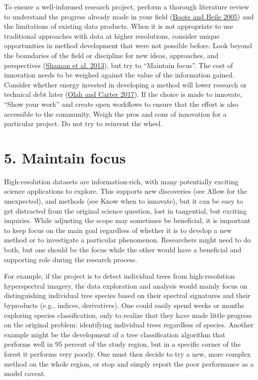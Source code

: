 \documentclass[
  12pt,
]{article}
\begin{document}
To ensure a well-informed research project, perform a thorough
literature review to understand the progress already made in your field
(\protect\hyperlink{ref-boote2005scholars}{Boote and Beile 2005}) and
the limitations of existing data products. When it is not appropriate to
use traditional approaches with data at higher resolutions, consider
unique opportunities in method development that were not possible
before. Look beyond the boundaries of the field or discipline for new
ideas, approaches, and perspectives
(\protect\hyperlink{ref-shaman2013fostering}{Shaman et al. 2013}), but
try to ``Maintain focus''. The cost of innovation needs to be weighed
against the value of the information gained. Consider whether energy
invested in developing a method will lower research or technical debt
later (\protect\hyperlink{ref-olah2017research}{Olah and Carter 2017}).
If the choice is made to innovate, ``Show your work'' and create open
workflows to ensure that the effort is also accessible to the community.
Weigh the pros and cons of innovation for a particular project. Do not
try to reinvent the wheel.

\hypertarget{maintain-focus}{%
\section{5. Maintain focus}\label{maintain-focus}}

High-resolution datasets are information-rich, with many potentially
exciting science applications to explore. This supports new discoveries
(see Allow for the unexpected), and methods (see Know when to innovate),
but it can be easy to get distracted from the original science question,
lost in tangential, but exciting inquiries. While adjusting the scope
may sometimes be beneficial, it is important to keep focus on the main
goal regardless of whether it is to develop a new method or to
investigate a particular phenomenon. Researchers might need to do both,
but one should be the focus while the other would have a beneficial and
supporting role during the research process.

For example, if the project is to detect individual trees from
high-resolution hyperspectral imagery, the data exploration and analysis
would mainly focus on distinguishing individual tree species based on
their spectral signatures and their byproducts (e.g., indices,
derivatives). One could easily spend weeks or months exploring species
classification, only to realize that they have made little progress on
the original problem: identifying individual trees regardless of
species. Another example might be the development of a tree
classification algorithm that performs well in 95 percent of the study
region, but in a specific corner of the forest it performs very poorly.
One must then decide to try a new, more complex method on the whole
region, or stop and simply report the poor performance as a model
caveat.
\end{document}
